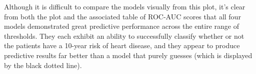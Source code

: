 \documentclass[10pt]{article}
\begin{document}
\begin{figure}[hbt!]
\hspace*{\fill}
\centering
{}\hspace{3em}
\hspace*{\fill}
\end{figure}


Although it is difficult to compare the models visually from this plot, it's clear from both the plot and the associated table of ROC-AUC scores that all four models demonstrated great predictive performance across the entire range of thresholds. They each exhibit an ability to successfully classify whether or not the patients have a 10-year risk of heart disease, and they appear to produce predictive results far better than a model that purely guesses (which is displayed by the black dotted line).
\end{document}
